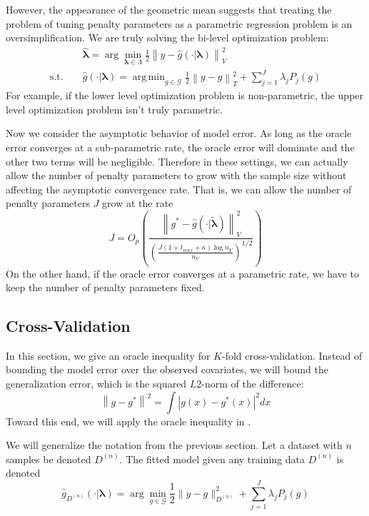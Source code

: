 \documentclass[12pt]{article}
\DeclareMathOperator*{\argmin}{arg\,min}
\begin{document}
However, the appearance of the geometric mean suggests that treating the problem of tuning penalty parameters as a parametric regression problem is an oversimplification. We are truly solving the bi-level optimization problem:
\begin{eqnarray}
\label{eq:bilevel}
&& \hat{\boldsymbol \lambda} = \arg\min_{\boldsymbol{\lambda} \in\Lambda} \frac{1}{2} \left \| y-\hat{g}(\cdot | \boldsymbol \lambda) \right \|_{V}^{2}\\
\text{s.t. } && \hat{g}(\cdot | \boldsymbol \lambda) = \argmin_{g\in \mathcal{G}} \frac{1}{2} \left \|y -  g \right \|_T^2 + \sum_{j=1}^J \lambda_j P_j(g)
\end{eqnarray}
For example, if the lower level optimization problem is non-parametric, the upper level optimization problem isn't truly parametric.

Now we consider the asymptotic behavior of model error. As long as the oracle error converges at a sub-parametric rate, the oracle error will dominate and the other two terms will be negligible. Therefore in these settings, we can actually allow the number of penalty parameters to grow with the sample size without affecting the asymptotic convergence rate. That is, we can allow the number of penalty parameters $J$ grow at the rate
\begin{equation}
J = O_p\left (
\frac{\left \| g^*-\hat{g}(\cdot | \tilde{\boldsymbol {\lambda}}) \right \|_{V}^{2}}
{\left(\frac{J\left(1+t_{max}+\kappa\right)\log n_{V}}{n_{V}}\right)^{1/2}}
\right)
\end{equation}
On the other hand, if the oracle error converges at a parametric rate, we have to keep the number of penalty parameters fixed.

\subsection{Cross-Validation}

In this section, we give an oracle inequality for $K$-fold cross-validation. Instead of bounding the model error over the observed covariates, we will bound the generalization error, which is the squared $L2$-norm of the difference:
\begin{equation}
\left \| g - g^* \right \|^2 = \int \left |g(x) - g^*(x) \right |^2 dx
\end{equation}
Toward this end, we will apply the oracle inequality in \citet{lecue2012oracle}.

We will generalize the notation from the previous section. Let a dataset with $n$ samples be denoted $D^{(n)}$. The fitted model given any training data $D^{(n)}$ is denoted
\begin{equation}
\hat{g}_{D^{(n)}}(\cdot | \boldsymbol \lambda)= \arg\min_{g\in\mathcal{G}} \frac{1}{2} \| y-g \|_{D^{(n)}}^{2} + \sum_{j=1}^J \lambda_j P_j(g)
\end{equation}
\end{document}
